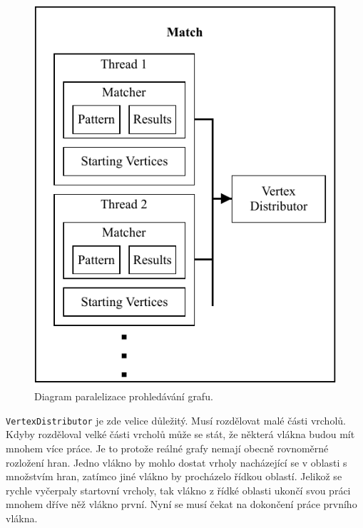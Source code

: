 \begin{figure}[!htp]
\includegraphics{../img/diaQueryObjectsMatchPar.pdf}\centering
\caption{Diagram paralelizace prohledávání grafu.}
\label{figure.diaQueryObjectsMatchPar}
\end{figure}

\texttt{VertexDistributor} je zde velice důležitý.
Musí rozdělovat malé části vrcholů.
Kdyby rozděloval velké části vrcholů může se stát, že některá vlákna budou mít mnohem více práce.
Je to protože reálné grafy nemají obecně rovnoměrné rozložení hran.
Jedno vlákno by mohlo dostat vrholy nacházející se v oblasti s množstvím hran, zatímco jiné vlákno by procházelo řídkou oblastí.
Jelikož se rychle vyčerpaly startovní vrcholy, tak vlákno z řídké oblasti ukončí svou práci mnohem dříve něž vlákno první.
Nyní se musí čekat na dokončení práce prvního vlákna.

